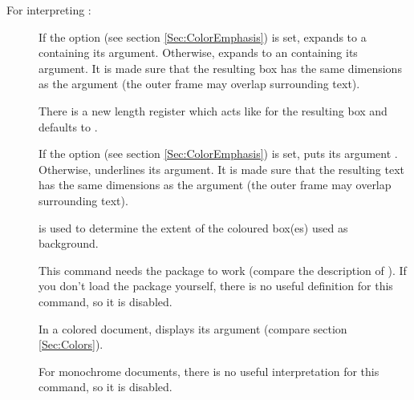 \documentclass[12pt]{scrartcl}
\let\newslide=\relax
\begin{document}
  \newslide

  For interpreting :
  \begin{description}
  \item[]
    If the  option (see section \ref{Sec:ColorEmphasis})
    is set, expands to a  containing its argument. Otherwise, expands to an
     containing its argument. It is made sure that the resulting box has the same dimensions as the
    argument (the outer frame may overlap surrounding text).

    There is a new length register 
     which acts like  for the
    resulting box and defaults to .

    \newslide

  \item[{}]
    If the  option (see section \ref{Sec:ColorEmphasis})
    is set, puts its argument . Otherwise, underlines its
    argument. It is made sure that the resulting text has the same dimensions as the argument (the outer frame may
    overlap surrounding text).

     is used to determine the extent of the coloured box(es) used as background.

    This command needs the \href{ftp://ftp.dante.de/tex-archive/help/Catalogue/entries/soul.html}{} package
    to work (compare the description of ). If you don't load the  package yourself, there
    is no useful definition for this command, so it is disabled.

    \newslide

  \item[]
    In a colored document, displays its argument  (compare section \ref{Sec:Colors}).

    For monochrome documents, there is no useful interpretation for this command, so it is disabled.
  \end{description}

  \newslide
\end{document}
